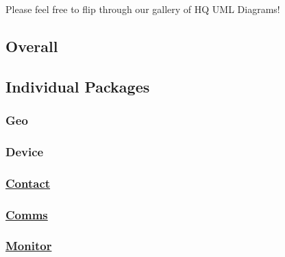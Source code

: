 Please feel free to flip through our gallery of HQ U\+ML Diagrams! \subsection*{Overall}

  

\subsection*{Individual Packages}

\subsubsection*{Geo}

 \subsubsection*{Device}

 \subsubsection*{\hyperlink{class_contact}{Contact}}

 \subsubsection*{\hyperlink{class_comms}{Comms}}

 \subsubsection*{\hyperlink{class_monitor}{Monitor}}

  